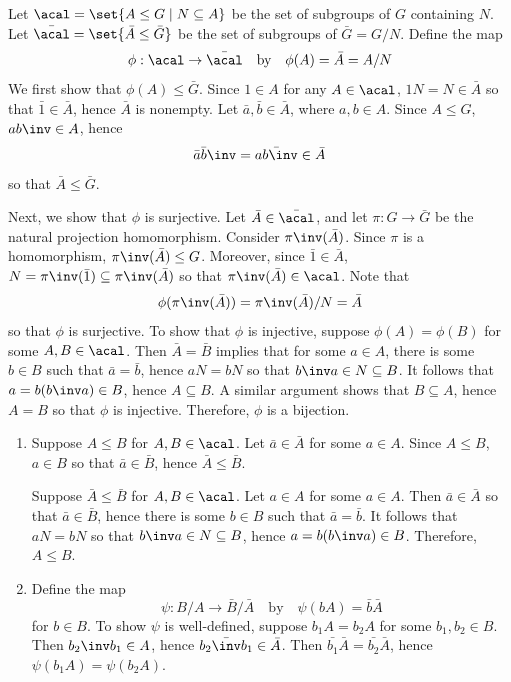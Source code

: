 \begin{sol}[spsol]
    Let $\acal = \set{A \leq G \mid N \subseteq A}$ be the set of subgroups of $G$ containing $N$.
	Let $\bar{\acal} = \set{\bar A \leq \bar G}$ be the set of subgroups of $\bar G = G/N$.
	Define the map
    \[
    	\phi : \acal \to \bar{\acal} \quad \text{by} \quad \phi(A) = \bar A = A/N
    \]
    We first show that $\phi(A) \leq \bar G$.
	Since $1 \in A$ for any $A \in \acal$, $1N = N \in \bar A$ so that $\bar 1 \in \bar A$, hence $\bar A$ is nonempty.
	Let $\bar a, \bar b \in \bar A$, where $a, b \in A$.
	Since $A \leq G$, $ab\inv \in A$, hence
    \[
    	\bar a \bar b\inv = \bar{ab\inv} \in \bar A
    \]
    so that $\bar A \leq \bar G$.

    Next, we show that $\phi$ is surjective.
	Let $\bar A \in \bar{\acal}$, and let $\pi : G \to \bar G$ be the natural projection homomorphism.
	Consider $\pi\inv(\bar A)$.
	Since $\pi$ is a homomorphism, $\pi\inv(\bar A) \leq G$.
	Moreover, since $\bar 1 \in \bar A$, $N = \pi\inv(\bar 1) \subseteq \pi\inv(\bar A)$ so that $\pi\inv(\bar A) \in \acal$.
	Note that
    \[
    	\phi(\pi\inv(\bar A)) = \pi\inv(\bar A)/N = \bar A
    \]
    so that $\phi$ is surjective.
	To show that $\phi$ is injective, suppose $\phi(A) = \phi(B)$ for some $A, B \in \acal$.
	Then $\bar A = \bar B$ implies that for some $a \in A$, there is some $b \in B$ such that $\bar a = \bar b$, hence $aN = bN$ so that $b\inv a \in N \subseteq B$.
	It follows that $a = b(b\inv a) \in B$, hence $A \subseteq B$.
	A similar argument shows that $B \subseteq A$, hence $A = B$ so that $\phi$ is injective.
	Therefore, $\phi$ is a bijection.
    \begin{enumerate}
        \item \rightimp Suppose $A \leq B$ for $A, B \in \acal$.
        Let $\bar a \in \bar A$ for some $a \in A$.
        Since $A \leq B$, $a \in B$ so that $\bar a \in \bar B$, hence $\bar A \leq \bar B$.
        
        \leftimp Suppose $\bar A \leq \bar B$ for $A, B \in \acal$.
        Let $a \in A$ for some $a \in A$.
        Then $\bar a \in \bar A$ so that $\bar a \in \bar B$, hence there is some $b \in B$ such that $\bar a = \bar b$.
        It follows that $aN = bN$ so that $b\inv a \in N \subseteq B$, hence $a = b(b\inv a) \in B$.
        Therefore, $A \leq B$.
        \item Define the map
        \[
        	\psi : B/A \to \bar B / \bar A \quad \text{by} \quad \psi(bA) = \bar b \bar A
        \]
        for $b \in B$.
        To show $\psi$ is well-defined, suppose $b_1A = b_2A$ for some $b_1, b_2 \in B$.
        Then $b_2\inv b_1 \in A$, hence $\bar{b_2\inv b_1} \in \bar A$.
        Then $\bar{b_1} \bar A = \bar{b_2} \bar A$, hence $\psi(b_1A) = \psi(b_2A)$.


\end{enumerate}
\end{sol}
